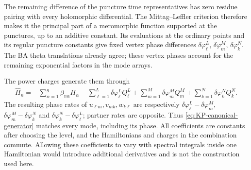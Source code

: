 The remaining difference of the puncture time representatives has
zero residue pairing with every holomorphic differential. The
Mittag--Leffler criterion therefore makes it the principal part of
a meromorphic function supported at the punctures, up to an
additive constant. Its evaluations at the ordinary points and its
regular puncture constants give fixed vertex phase differences
$\delta\varphi_\ell^L$, $\delta\varphi_m^M$, $\delta\varphi_k^N$.
The BA theta translations already agree; these vertex phases account
for the remaining exponential factors in the mode arrays.

The power charges generate them through
\begin{equation}\label{eq:KP-canonical-generator}
\begin{aligned}
 \widehat H_n={}&\sum_{\alpha=1}^{g}\beta_{n\alpha}H_\alpha
 -\sum_{\ell=1}^{L}\delta\varphi_\ell^L Q_\ell^L
 +\sum_{m=1}^{M}\delta\varphi_m^M Q_m^M
 +\sum_{k=1}^{N}\delta\varphi_k^N Q_k^N.
\end{aligned}
\end{equation}
The resulting phase rates of $u_{\ell m},v_{mk},w_{k\ell}$ are
respectively $\delta\varphi_\ell^L-\delta\varphi_m^M$,
$\delta\varphi_m^M-\delta\varphi_k^N$ and
$\delta\varphi_k^N-\delta\varphi_\ell^L$; partner rates are opposite.
Thus \cref{eq:KP-canonical-generator} matches every mode, including
its phase. All coefficients are constants after choosing the level,
and the Hamiltonians and charges in the combination commute.
Allowing these coefficients to vary with spectral integrals inside
one Hamiltonian would introduce additional derivatives and is not
the construction used here.
